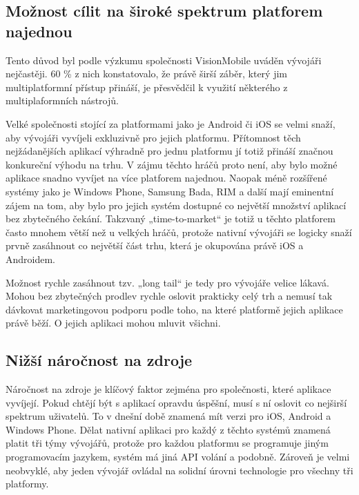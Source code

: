 \subsection{Možnost cílit na široké spektrum platforem najednou}
Tento důvod byl podle výzkumu společnosti VisionMobile uváděn vývojáři nejčastěji. 60 \% z nich konstatovalo, že právě širší záběr, který jim multiplatformní přístup přináší, je přesvědčil k využití některého z multiplaformních nástrojů. \cite{visionmobile_survey}

Velké společnosti stojící za platformami jako je Android či iOS se velmi snaží, aby vývojáři vyvíjeli exkluzivně pro jejich platformu. Přítomnost těch nejžádanějších aplikací výhradně pro jednu platformu jí totiž přináší značnou konkureční výhodu na trhu. V zájmu těchto hráčů proto není, aby bylo možné aplikace snadno vyvíjet na více platforem najednou. Naopak méně rozšířené systémy jako je Windows Phone, Samsung Bada, RIM a další mají eminentní zájem na tom, aby bylo pro jejich systém dostupné co největší množství aplikací bez zbytečného čekání. Takzvaný „time-to-market“ je totiž u těchto platforem často mnohem větší než u velkých hráčů, protože nativní vývojáři se logicky snaží prvně zasáhnout co největší část trhu, která je okupována právě iOS a Androidem. 

Možnost rychle zasáhnout tzv. „long tail“ je tedy pro vývojáře velice lákavá. Mohou bez zbytečných prodlev rychle oslovit prakticky celý trh a nemusí tak dávkovat marketingovou podporu podle toho, na které platformě jejich aplikace právě běží. O jejich aplikaci mohou mluvit všichni.

\subsection{Nižší náročnost na zdroje}
Náročnost na zdroje je klíčový faktor zejména pro společnosti, které aplikace vyvíjejí. Pokud chtějí být s aplikací opravdu úspěšní, musí s ní oslovit co nejširší spektrum uživatelů. To v dnešní době znamená mít verzi pro iOS, Android a Windows Phone. Dělat nativní aplikaci pro každý z těchto systémů znamená platit tři týmy vývojářů, protože pro každou platformu se programuje jiným programovacím jazykem, systém má jiná API volání a podobně. Zároveň je velmi neobvyklé, aby jeden vývojář ovládal na solidní úrovni technologie pro všechny tři platformy.

